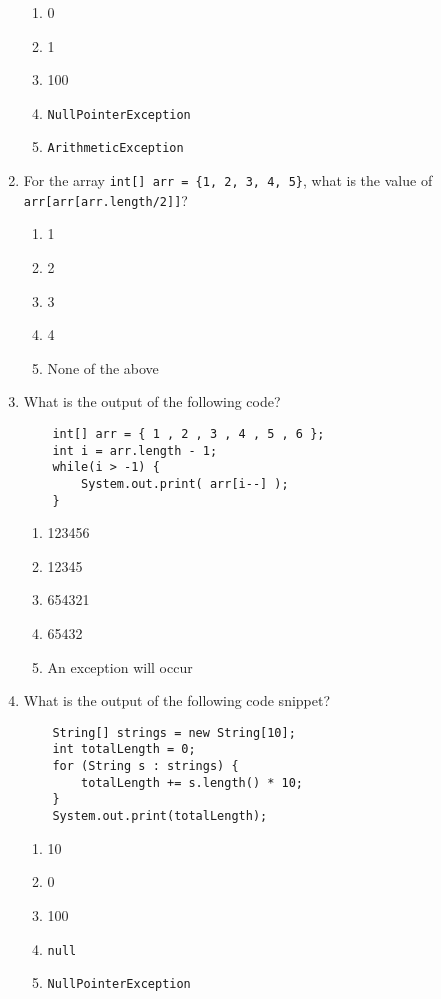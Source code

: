 \documentclass[S17-Final.tex]{subfiles}
\begin{document}
\begin{enumerate}
\begin{enumerate}
\item  0
\item  1
\item  100
\item  \texttt{NullPointerException}
\item  \texttt{ArithmeticException}
\end{enumerate}

\item For the array \texttt{int[] arr = \{1, 2, 3, 4, 5\}}, what is the value of \texttt{arr[arr[arr.length/2]]}?
	
\begin{enumerate}
\item  1
\item  2
\item  3
\item  4
\item  None of the above
\end{enumerate}

\item What is the output of the following code?
\begin{lstlisting}
    int[] arr = { 1 , 2 , 3 , 4 , 5 , 6 };
    int i = arr.length - 1;
    while(i > -1) {
        System.out.print( arr[i--] );
    }
\end{lstlisting}
	
\begin{enumerate}
\item  123456
\item  12345
\item  654321
\item  65432
\item  An exception will occur
\end{enumerate}

\item What is the output of the following code snippet?
\begin{lstlisting}
    String[] strings = new String[10];
    int totalLength = 0;
    for (String s : strings) {
        totalLength += s.length() * 10;
    }
    System.out.print(totalLength);
\end{lstlisting}
	
\begin{enumerate}
\item  10
\item  0
\item  100
\item  \texttt{null}
\item  \texttt{NullPointerException}
\end{enumerate}


\end{enumerate}
\end{document}
